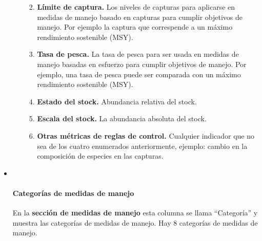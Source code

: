 \documentclass[
  11pt,
]{book}
\providecommand{\tightlist}{%
  \setlength{\itemsep}{0pt}\setlength{\parskip}{0pt}}
\begin{document}
\begin{itemize}
\begin{enumerate}
    \begin{enumerate}
    \def\labelenumii{\alph{enumii}.}
    \tightlist
    \item
      \textbf{Límite de captura.} Los niveles de capturas para aplicarse en medidas de manejo basado en capturas para cumplir objetivos de manejo. Por ejemplo la captura que correspende a un máximo rendimiento sostenible (MSY).
    \item
      \textbf{Tasa de pesca.} La tasa de pesca para ser usada en medidas de manejo basadas en esfuerzo para cumplir objetivos de manejo. Por ejemplo, una tasa de pesca puede ser comparada con un máximo rendimiento sostenible (MSY).
    \item
      \textbf{Estado del stock.} Abundancia relativa del stock.
    \item
      \textbf{Escala del stock.} La abundancia absoluta del stock.
    \item
      \textbf{Otras métricas de reglas de control.} Cualquier indicador que no sea de los cuatro enumerados anteriormente, ejemplo: cambio en la composición de especies en las capturas.
    \end{enumerate}
  \end{enumerate}
\item ~
  \hypertarget{Management-Measure-Categories}{%
  \paragraph{Categorías de medidas de manejo}\label{Management-Measure-Categories}}

  En la \textbf{sección de medidas de manejo} esta columna se llama ``Categoría'' y muestra las categorías de medidas de manejo. Hay 8 categorías de medidas de manejo.


\end{itemize}
\end{document}
